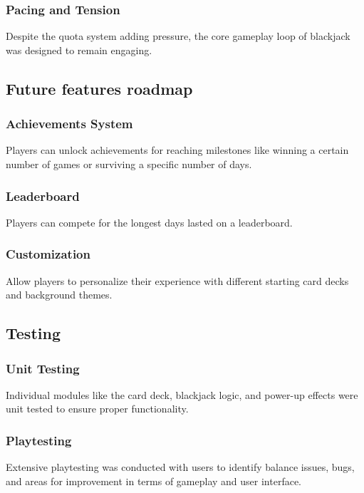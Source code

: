 \documentclass[9pt,a4paper,twoside]{tau-class/tau}
\begin{document}
    \subsubsection{Pacing and Tension} 
    Despite the quota system adding pressure, the core gameplay loop of blackjack was designed to remain engaging. 
    
    \subsection{Future features roadmap} 
    
    \subsubsection{Achievements System}
    Players can unlock achievements for reaching milestones like winning a certain number of games or surviving a specific number of days. 
    
    \subsubsection{Leaderboard}
    Players can compete for the longest days lasted on a leaderboard. 
    
    \subsubsection{Customization}
    Allow players to personalize their experience with different starting card decks and background themes. 
    
    \subsection{Testing} 
    
    \subsubsection{Unit Testing} 
    Individual modules like the card deck, blackjack logic, and power-up effects were unit tested to ensure proper functionality. 
    
    \subsubsection{Playtesting} 
    Extensive playtesting was conducted with users to identify balance issues, bugs, and areas for improvement in terms of gameplay and user interface. 
    
\end{document}
